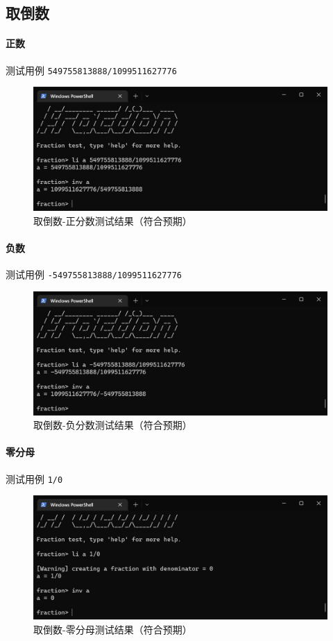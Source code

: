 \documentclass[cn,black,12pt,normal]{elegantnote}
\begin{document}
\subsection{取倒数}

\paragraph{正数} 测试用例 \lstinline{549755813888/1099511627776}
\begin{figure}[H]
    \centering
    \includegraphics[width=.8\textwidth]{imgs/test_inv_positive_frac.jpg}
    \caption{取倒数-正分数测试结果（符合预期）}
\end{figure}

\paragraph{负数} 测试用例 \lstinline{-549755813888/1099511627776}
\begin{figure}[H]
    \centering
    \includegraphics[width=.8\textwidth]{imgs/test_inv_negative_frac.jpg}
    \caption{取倒数-负分数测试结果（符合预期）}
\end{figure}

\paragraph{零分母} 测试用例 \lstinline{1/0}
\begin{figure}[H]
    \centering
    \includegraphics[width=.8\textwidth]{imgs/test_inv_zero1.jpg}
    \caption{取倒数-零分母测试结果（符合预期）}
\end{figure}
\end{document}
